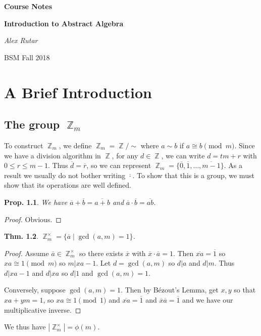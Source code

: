 \documentclass[12pt, a4paper]{book}
\DeclareMathOperator{\Z}{\mathbb{Z}}
\newtheorem{theorem}{Thm.}[section]
\newtheorem{proposition}[theorem]{Prop.}
\theoremstyle{nonumberplain}
\newtheorem{proof}{Proof}
\newcommand{\assignmentname}{Course Notes}
\newcommand{\classname}{Introduction to Abstract Algebra}
\newcommand{\semester}{BSM Fall 2018}
\begin{document}
\begin{titlepage}
    \centering
    \vspace{5cm}
    {\huge\textbf{\assignmentname}\par} %
    \vspace{2cm}
    {\Large\textbf{\classname}\par} %
    \vspace{3cm}
    {\Large\textit{Alex Rutar}\par}

    \vfill

    {\large \semester \par} %
\end{titlepage}
{}
\tableofcontents
{}
\setcounter{chapter}{-1}
\chapter{A Brief Introduction}
\section{The group $\Z_m$}
To construct $\Z_m$, we define $\Z_m=\Z/\sim$ where $a\sim b$ if $a\cong b\pmod{m}$.
Since we have a division algorithm in $\Z$, for any $d\in\Z$, we can write $d=tm+r$ with $0\leq r\leq m-1$.
Thus $\overline{d}=\overline{r}$, so we can represent $\Z_m=\{\overline{0},\overline{1},\ldots,\overline{m-1}\}$.
As a result we usually do not bother writing $\overline{\cdot}$.
To show that this is a group, we must show that its operations are well defined.
\begin{proposition}
    We have $\overline{a}+\overline{b}=\overline{a+b}$ and $\overline{a}\cdot\overline{b}=\overline{ab}$.
\end{proposition}
\begin{proof}
    Obvious.
\end{proof}
\begin{theorem}
    $\Z_m^\times=\{\overline{a}\mid\gcd(a,m)=1\}$.
\end{theorem}
\begin{proof}
    Assume $\overline{a}\in\Z^\times_m$ so there exists $\overline{x}$ with $\overline{x}\cdot\overline{a}=1$.
    Then $\overline{xa}=\overline{1}$ so $xa\cong 1\pmod{m}$ so $m|xa-1$.
    Let $d=\gcd(a,m)$ so $d|a$ and $d|m$.
    Thus $d|xa-1$ and $d|xa$ so $d|1$ and $\gcd(a,m)=1$.

    Conversely, suppose $\gcd(a,m)=1$.
    Then by B\'ezout's Lemma, get $x,y$ so that $xa+ym=1$, so $xa\cong 1\pmod{1}$ and $\overline{xa}=\overline{1}$ and $\overline{x}\overline{a}=\overline{1}$ and we have our multiplicative inverse.
\end{proof}
We thus have $|\Z_m^\times|=\phi(m)$.
\end{document}
